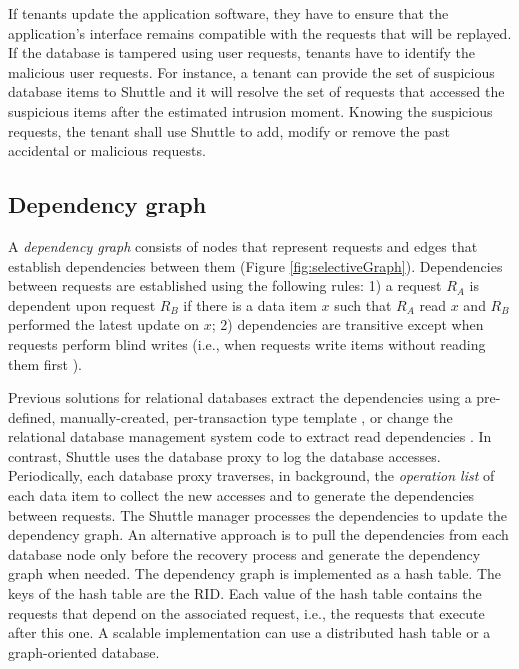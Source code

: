\documentclass[10pt,conference]{IEEEtran}
\newcommand{\LONG}[1]{}
\begin{document}
If tenants update the application software, they have to ensure that the application's interface remains compatible with the requests that will be replayed. If the database is tampered using user requests,  tenants have to identify the malicious user requests. For instance, a tenant can provide the set of suspicious database items to Shuttle and it will resolve the set of requests that accessed the suspicious items after the estimated intrusion moment. Knowing the suspicious requests, the tenant shall use Shuttle to add, modify or remove the past accidental or malicious requests. 

\subsection{Dependency graph}
\label{sec:recovery:dependencies}

A \emph{dependency graph} consists of nodes that represent requests and edges that establish dependencies between them (Figure \ref{fig:selectiveGraph}). Dependencies between requests are established using the following rules: 1) a request $R_A$ is dependent upon request $R_B$ if there is a data item $x$ such that $R_A$ read $x$ and $R_B$ performed the latest update on $x$; 2) dependencies are transitive except when requests perform blind writes (i.e., when requests write items without reading them first \cite{itdb}). \LONG{cite{Ammann2002}}

Previous solutions for relational databases extract the dependencies using a pre-defined, manually-created, per-transaction type template \cite{itdb}\LONG{cite{Ammann2002}}, or change the relational database management system code to extract read dependencies \cite{phoenix}. In contrast, Shuttle uses the database proxy to log the database accesses. Periodically, each database proxy traverses, in background, the \emph{operation list} of each data item to collect the new accesses and to generate the dependencies between requests. The Shuttle manager processes the dependencies to update the dependency graph. An alternative approach is to pull the dependencies from each database node only before the recovery process and generate the dependency graph when needed. The dependency graph is implemented as a hash table. The keys of the hash table are the \ac{RID}. Each value of the hash table contains the requests that depend on the associated request, i.e., the requests that execute after this one. A scalable implementation can use a distributed hash table or a graph-oriented database.
\end{document}
